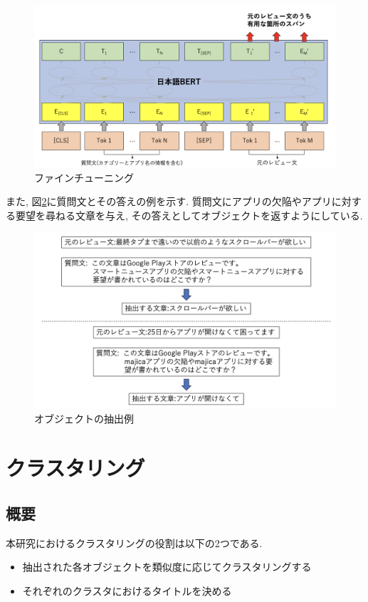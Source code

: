 \begin{figure}[hbtp]
  \centering
  \includegraphics[scale=0.3]
       {contents/images/fine-tuning.png}
  \caption{ファインチューニング\label{fig:fine-tuning}}
\end{figure}

また, 図\ref{fig:answer}に質問文とその答えの例を示す. 質問文にアプリの欠陥やアプリに対する要望を尋ねる文章を与え, その答えとしてオブジェクトを返すようにしている. 

\begin{figure}[hbtp]
  \centering
  \includegraphics[scale=0.4]
       {contents/images/answer.png}
  \caption{オブジェクトの抽出例\label{fig:answer}}
\end{figure}


\section{クラスタリング}
\subsection{概要}
本研究におけるクラスタリングの役割は以下の2つである. 
\begin{itemize}
  \item 抽出された各オブジェクトを類似度に応じてクラスタリングする
  \item それぞれのクラスタにおけるタイトルを決める
\end{itemize}

